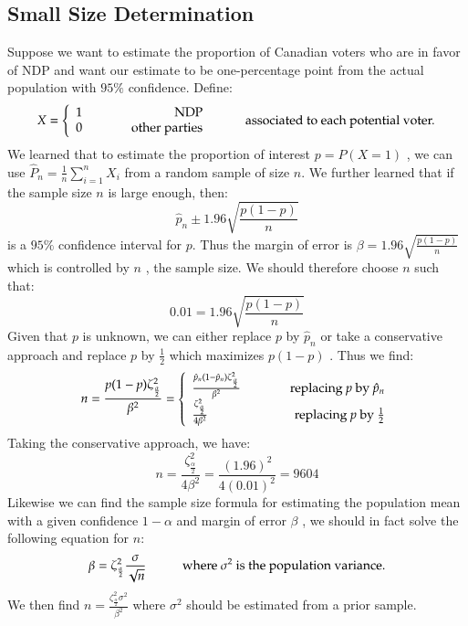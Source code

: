 \documentclass[14pt,twoside,a4paper,fleqn]{article}
\theoremstyle{plain}
\begin{document}
\subsection{Small Size Determination}
Suppose we want to estimate the proportion of Canadian voters who are in favor of NDP and want our estimate to be one-percentage point from the actual population with $95\%$ confidence. Define:
$$
X = \left\{
	\begin{array}{lr}
	1 & \hspace*{1cm} \text{NDP} \\
	0 & \hspace*{1cm} \text{other parties}
	\end{array}
\hspace*{1cm}\text{associated to each potential voter.}
\right.$$
We learned that to estimate the proportion of interest $p=P(X=1)$ , we can use \mbox{$\hat{P}_n = \frac{1}{n}\sum_{i=1}^n X_i$} from a random sample of size $n$. We further learned that if the sample size $n$ is large enough, then:
$$
	\hat{p}_n \pm 1.96 \sqrt{\frac{p(1-p)}{n}}
$$
is a $95\%$ confidence interval for $p$. Thus the margin of error is $\beta = 1.96\sqrt{\frac{p(1-p)}{n}}$ which is controlled by $n$ , the sample size. We should therefore choose $n$ such that:
$$
	0.01 = 1.96 \sqrt{\frac{p(1-p)}{n}}
$$
Given that $p$ is unknown, we can either replace $p$ by $\hat{p}_n$ or take a conservative approach and replace $p$ by $\frac{1}{2}$ which maximizes $p(1-p)$ . Thus we find:
$$
n = \frac{p(1-p)\zeta^2_{\frac{\alpha}{2}}}{\beta^2} = \left\{
	\begin{array}{lr}
	\frac{\hat{p}_n(1-\hat{p}_n)\zeta^2_{\frac{\alpha}{2}}}{\beta^2} &\hspace*{1cm} \text{replacing $p$ by $\hat{p}_n$} \\
	\frac{\zeta^2_{\frac{\alpha}{2}}}{4\beta^2} & \hspace*{1cm}\text{replacing $p$ by $\frac{1}{2}$}
	\end{array}
	\right.
$$
Taking the conservative approach, we have:
$$
	n = \frac{\zeta^2_{\frac{\alpha}{2}}}{4\beta^2}  = \frac{(1.96)^2}{4(0.01)^2} = 9604
$$
Likewise we can find the sample size formula for estimating the population mean with a given confidence $1-\alpha$ and margin of error $\beta$ , we should in fact solve the following equation for $n$: 
$$
	\beta = \zeta^2_{\frac{\alpha}{2}} \frac{\sigma}{\sqrt{n}}\hspace*{1cm}\text{where $\sigma^2$ is the population variance.}
$$
We then find $\boxed{n = \frac{\zeta^2_{\frac{\alpha}{2}}\sigma^2}{\beta^2}}$ where $\sigma^2$ should be estimated from a prior sample.\\
\end{document}
